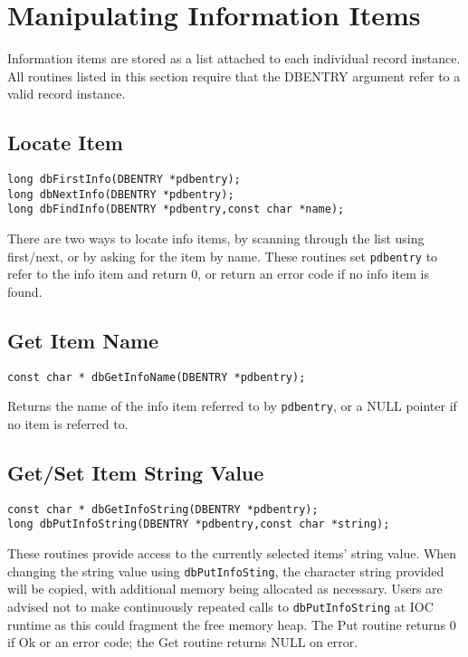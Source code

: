 \section{Manipulating Information Items}

Information items are stored as a list attached to each individual record instance. All routines listed in this section require 
that the DBENTRY argument refer to a valid record instance.

\subsection{Locate Item}

\begin{verbatim}
long dbFirstInfo(DBENTRY *pdbentry);
long dbNextInfo(DBENTRY *pdbentry);
long dbFindInfo(DBENTRY *pdbentry,const char *name);
\end{verbatim}

There are two ways to locate info items, by scanning through the list using first/next, or by asking for the item by name. 
These routines set \verb|pdbentry| to refer to the info item and return 0, or return an error code if no info item is found.

\subsection{Get Item Name}

\begin{verbatim}
const char * dbGetInfoName(DBENTRY *pdbentry);
\end{verbatim}

Returns the name of the info item referred to by \verb|pdbentry|, or a NULL pointer if no item is referred to.

\subsection{Get/Set Item String Value}

\begin{verbatim}
const char * dbGetInfoString(DBENTRY *pdbentry);
long dbPutInfoString(DBENTRY *pdbentry,const char *string);
\end{verbatim}

These routines provide access to the currently selected items' string value. When changing the string value using 
\verb|dbPutInfoSting|, the character string provided will be copied, with additional memory being allocated as necessary. 
Users are advised not to make continuously repeated calls to \verb|dbPutInfoString| at IOC runtime as this could fragment 
the free memory heap. The Put routine returns 0 if Ok or an error code; the Get routine returns NULL on error.

